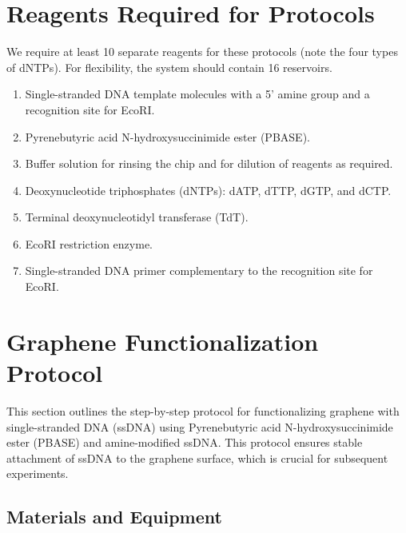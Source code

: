 \documentclass[11pt]{article}
\begin{document}
\section*{Reagents Required for Protocols}

We require at least 10 separate reagents for these protocols (note the four types of dNTPs).
For flexibility, the system should contain 16 reservoirs.

\begin{enumerate}
    \item Single-stranded DNA template molecules with a 5' amine group and a recognition site for EcoRI.
    \item Pyrenebutyric acid N-hydroxysuccinimide ester (PBASE).
    \item Buffer solution for rinsing the chip and for dilution of reagents as required.
    \item Deoxynucleotide triphosphates (dNTPs): dATP, dTTP, dGTP, and dCTP.
    \item Terminal deoxynucleotidyl transferase (TdT).
    \item EcoRI restriction enzyme.
    \item Single-stranded DNA primer complementary to the recognition site for EcoRI.
\end{enumerate}

\section*{Graphene Functionalization Protocol}

This section outlines the step-by-step protocol for functionalizing graphene with single-stranded DNA (ssDNA) using Pyrenebutyric acid N-hydroxysuccinimide ester (PBASE) and amine-modified ssDNA. This protocol ensures stable attachment of ssDNA to the graphene surface, which is crucial for subsequent experiments.

\subsection*{Materials and Equipment}
\end{document}
